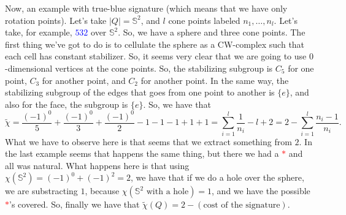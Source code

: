 \begin{example} Now, an example with true-blue signature (which means that we have only rotation points). Let's take $\vert Q \vert = \mathbb{S}^{2}$, and $l$ cone points labeled $n_{1}, \ldots, n_{l}$. Let's take, for example, \textcolor{blue}{$532$} over $\mathbb{S}^{2}$. So, we have a sphere and three cone points. The first thing we've got to do is to cellulate the sphere as a CW-complex such that each cell has constant stabilizer. So, it seems very clear that we are going to use $0$-dimensional vertices at the cone points. So, the stabilizing subgroup is $C_{5}$ for one point, $C_{3}$ for another point, and $C_{2}$ for another point. In the same way, the stabilizing subgroup of the edges that goes from one point to another is $\lbrace e \rbrace$, and also for the face, the subgroup is $\lbrace e \rbrace$. So, we have that $$\tilde{\chi} = \frac{(-1)^{0}}{5} + \frac{(-1)^{0}}{3} + \frac{(-1)^{0}}{2} - 1 - 1 - 1 + 1 + 1 = \sum_{i = 1}^{l} \frac{1}{n_{i}} - l + 2 = 2 - \sum_{i = 1}^{l} \frac{n_{i} - 1}{n_{i}}.$$
What we have to observe here is that seems that we extract something from $2$. In the last example seems that happens the same thing, but there we had a \textcolor{red}{$*$} and all was natural. What happens here is that using $\chi({\mathbb{S}^{2}}) = (-1)^{0} + (-1)^{2} = 2$, we have that if we do a hole over the sphere, we are substracting $1$, because $\chi(\mathbb{S}^{2} \text{ with a hole}) = 1$, and we have the possible \textcolor{red}{$*$}'s covered. So, finally we have that $\tilde{\chi}(Q) = 2 - (\text{cost of the signature})$.
\end{example}



